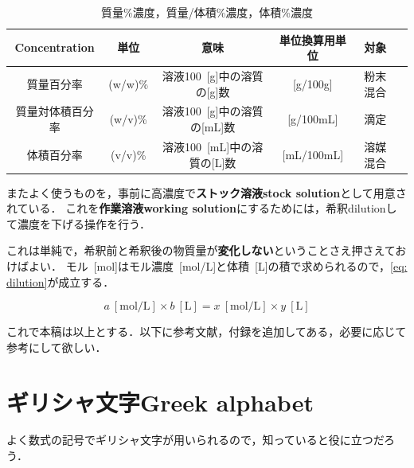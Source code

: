\documentclass[a4paper,11pt]{ltjsarticle}
\numberwithin{equation}{section}
\begin{document}
\begin{table}[htbp]
  \caption{質量\%濃度，質量/体積\%濃度，体積\%濃度}
  \label{tab: con-1}
  \centering
  \begin{tabular}{cccccc}
    \hline
    Concentration & 単位 & 意味 & 単位換算用単位 & 対象 \\
    \hline
    質量百分率 & (w/w)\% & 溶液100\ [g]中の溶質の[g]数 & [g/100g] & 粉末混合 \\
    質量対体積百分率 & (w/v)\% & 溶液100\ [g]中の溶質の[mL]数 & [g/100mL] & 滴定 \\
    体積百分率 & (v/v)\% & 溶液100\ [mL]中の溶質の[L]数 & [mL/100mL] & 溶媒混合 \\
    \hline
  \end{tabular}
\end{table}

またよく使うものを，事前に高濃度で\textbf{ストック溶液stock solution}として用意されている．
これを\textbf{作業溶液working solution}にするためには，希釈dilutionして濃度を下げる操作を行う．

これは単純で，希釈前と希釈後の物質量が\textbf{変化しない}ということさえ押さえておけばよい．
モル\ [mol]はモル濃度\ [mol/L]と体積\ [L]の積で求められるので，\cref{eq: dilution}が成立する．

\begin{equation}
  a\ [\mathrm{mol/L}] \times b\ [\mathrm{L}] = x\ [\mathrm{mol/L}] \times y\ [\mathrm{L}] \label{eq: dilution}
\end{equation}

これで本稿は以上とする．以下に参考文献，付録を追加してある，必要に応じて参考にして欲しい．

\cleardoublepage

\lhead{}
{}



\cleardoublepage
\appendix
\begingroup
\renewcommand{\addcontentsline}[3]{}

\section{ギリシャ文字Greek alphabet}

よく数式の記号でギリシャ文字が用いられるので，知っていると役に立つだろう．
\end{document}
